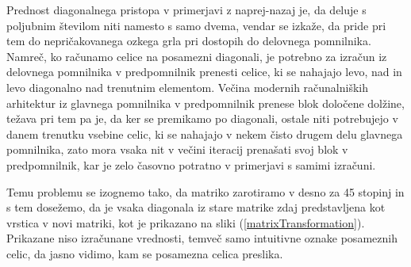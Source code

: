\documentclass[a4paper,12pt,openright]{book}
\begin{document}
Prednost diagonalnega pristopa v primerjavi z naprej-nazaj je, da deluje s poljubnim številom niti namesto s samo dvema, vendar se izkaže, da pride pri tem do nepričakovanega ozkega grla pri dostopih do delovnega pomnilnika. Namreč, ko računamo celice na posamezni diagonali, je potrebno za izračun iz delovnega pomnilnika v predpomnilnik prenesti celice, ki se nahajajo levo, nad in levo diagonalno nad trenutnim elementom. Večina modernih računalniških arhitektur iz glavnega pomnilnika v predpomnilnik prenese blok določene dolžine, težava pri tem pa je, da ker se premikamo po diagonali, ostale niti potrebujejo v danem trenutku vsebine celic, ki se nahajajo v nekem čisto drugem delu glavnega pomnilnika, zato mora vsaka nit v večini iteracij prenašati svoj blok v predpomnilnik, kar je zelo časovno potratno v primerjavi s samimi izračuni. 

Temu problemu se izognemo tako, da matriko zarotiramo v desno za 45 stopinj in s tem dosežemo, da je vsaka diagonala iz stare matrike zdaj predstavljena kot vrstica v novi matriki, kot je prikazano na sliki (\ref{matrixTransformation}). Prikazane niso izračunane vrednosti, temveč samo intuitivne oznake posameznih celic, da jasno vidimo, kam se posamezna celica preslika. 
\end{document}
